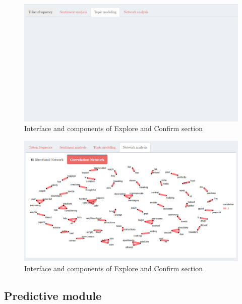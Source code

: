 \documentclass{acm_proc_article-sp}
\begin{document}
\begin{figure}[H]

{\centering \includegraphics[width=1\linewidth]{images/topicmodelling} 

}

\caption{Interface and components of Explore and Confirm section}\label{fig:unnamed-chunk-7}
\end{figure}

\begin{figure}[H]

{\centering \includegraphics[width=1\linewidth]{images/correlationnetwork} 

}

\caption{Interface and components of Explore and Confirm section}\label{fig:unnamed-chunk-8}
\end{figure}

\hypertarget{predictive-module}{%
\subsection{Predictive module}\label{predictive-module}}
\end{document}
